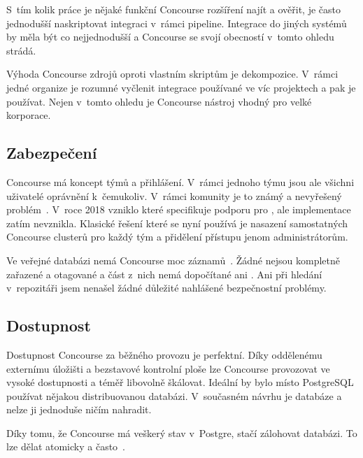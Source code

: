         S~tím kolik práce je nějaké funkční Concourse rozšíření najít a ověřit, je často jednodušší naskriptovat integraci v~rámci pipeline. Integrace \CI do jiných systémů by měla být co nejjednodušší a Concourse se svojí obecností v~tomto ohledu strádá.

        Výhoda Concourse zdrojů oproti vlastním skriptům je dekompozice. V~rámci jedné organize je rozumné vyčlenit integrace používané ve víc projektech a pak je používat. Nejen v~tomto ohledu je Concourse nástroj vhodný pro velké korporace.

    \subsection{Zabezpečení}
        \label{subsec:concourse-security}

        Concourse má koncept týmů a přihlášení. V~rámci jednoho týmu jsou ale všichni uživatelé oprávnění k~čemukoliv. V~rámci komunity je to známý a nevyřešený problém~\cite{concourse-issue-1317}. V~roce 2018 vzniklo  které specifikuje podporu pro , ale implementace zatím nevznikla. Klasické řešení které se nyní používá je nasazení samostatných Concourse clusterů pro každý tým a přidělení přístupu jenom administrátorům.

        Ve veřejné databázi  nemá Concourse moc záznamů~\cite{cve-concourse}. Žádné nejsou kompletně zařazené a otagované a část z~nich nemá dopočítané ani . Ani při hledání v~repozitáři jsem nenašel žádné důležité nahlášené bezpečnostní problémy.

    \subsection{Dostupnost}
        Dostupnost Concourse za běžného provozu je perfektní. Díky oddělenému externímu úložišti a bezstavové kontrolní ploše lze Concourse provozovat ve vysoké dostupnosti a téměř libovolně škálovat. Ideální by bylo místo PostgreSQL používat nějakou distribuovanou  databázi. V~současném návrhu je databáze  a nelze ji jednoduše ničím nahradit.

        Díky tomu, že Concourse má veškerý stav v~Postgre, stačí zálohovat databázi. To lze dělat atomicky a často~\cite{pg-backup}.


